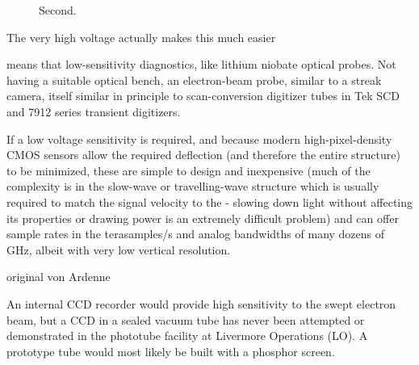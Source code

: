 \documentclass[paper.tex]{subfiles}
\begin{document}
\begin{figure}[H]
	\centering
	\hfill
		\hfill

	\caption{Second.}
		\hfill

\end{figure}



\begin{figure}[H]
	\captionsetup{singlelinecheck = false, justification=justified}
	\centering
	
	\caption{}
\end{figure}


\begin{figure}[H]
	\captionsetup{singlelinecheck = false, justification=justified}
	\centering
	
	\caption{}
\end{figure}


The very high voltage actually makes this much easier

means that low-sensitivity diagnostics, like lithium niobate optical probes. Not having a suitable optical bench, an electron-beam probe, similar to a streak camera, itself similar in principle to scan-conversion digitizer tubes in Tek SCD and 7912 series transient digitizers.

If a low voltage sensitivity is required, and because modern high-pixel-density CMOS sensors allow the required deflection (and therefore the entire structure) to be minimized, these are simple to design and inexpensive (much of the complexity is in the slow-wave or travelling-wave structure which is usually required to match the signal velocity to the - slowing down light without affecting its properties or drawing power is an extremely difficult problem) and can offer sample rates in the terasamples/s and analog bandwidths of many dozens of GHz, albeit with very low vertical resolution. 

original von Ardenne 


\begin{fquote}
An internal CCD recorder would provide high sensitivity to the swept electron beam, but a CCD in a sealed vacuum tube has never been attempted or demonstrated in the phototube facility at Livermore Operations (LO). A prototype tube would most likely be built with a phosphor screen.
\end{fquote}
\end{document}
